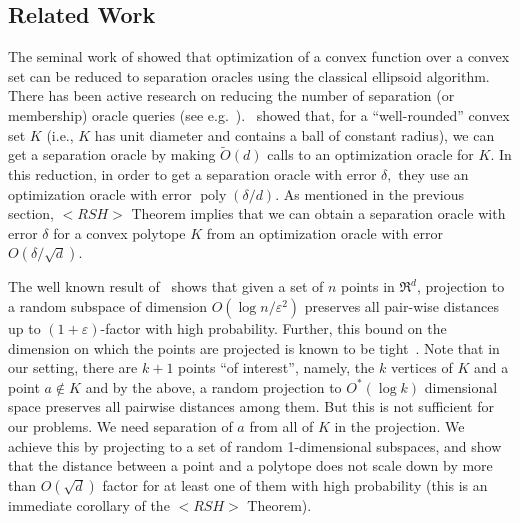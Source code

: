 \documentclass[11pt,letterpaper]{article}
\def\mathsf#1{<#1>}%
\def\xspace{}%
\theoremstyle{definition}
\theoremstyle{remark}
\newcommand{\poly}{\operatorname{poly}}
\newcommand{\rsh}{{\mathsf {RSH}}\xspace}
\begin{document}
\subsection{Related Work}
The seminal work of \cite{GLS1988} showed that optimization of a convex function over a convex set can be reduced to separation oracles using the classical ellipsoid algorithm. There has been active research on  reducing the number of separation (or membership) oracle queries (see e.g.~\cite{abernethy2015faster,KalaiV06, LovaszV06}).~\cite{LeeSV18} showed that, for a ``well-rounded'' convex set $K$ (i.e.,  $K$ has unit diameter and contains a ball of constant radius), we can get a separation oracle by making ${\widetilde O}(d)$ calls to an optimization oracle for $K$. In this reduction, in order to get a separation oracle with error $\delta,$ they use an optimization oracle with error $\poly(\delta/d)$. As mentioned in the previous section, $\rsh$ Theorem implies that we can obtain a separation oracle with error $\delta$ for a convex polytope $K$ from an optimization oracle with error $O(\delta/\sqrt{d})$. 

The well known result of~\cite{jl} shows that given a set of $n$ points in $\Re^d$, projection to a random subspace of dimension $O(\log n/\varepsilon^2)$ preserves all pair-wise distances up to $(1 + \varepsilon)$-factor with high probability. Further, this bound on the dimension on which the points are projected is known to be tight~\cite{alon2003problems, LarsenN17}. Note that in our setting, there are $k+1$ points ``of interest'', namely, the $k$ vertices of $K$ and a point $a\notin K$ and by the above, a random projection to $O^*(\log k)$ dimensional space preserves all pairwise distances among them. But this is not sufficient for our problems. We need separation of $a$ from all of $K$ in the projection. We achieve this by projecting to a set of random 1-dimensional subspaces, and show that the distance between a point and a polytope does not scale down by more than $O(\sqrt{d})$ factor for at least one of them with high probability (this is an immediate corollary of the $\rsh$ Theorem).
\end{document}
